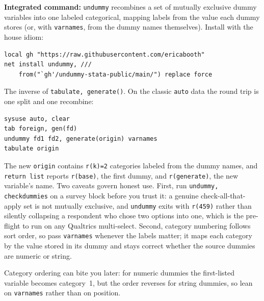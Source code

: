 \documentclass[
    a4paper,
    fontsize=10pt,
    twoside=true,
    numbers=noenddot,
]{kaobook}
\begin{document}
\begin{kaobox}[frametitle=Package Integration: \texttt{undummy}]
\textbf{Integrated command:} \texttt{undummy} recombines a set of mutually exclusive dummy variables into one labeled categorical, mapping labels from the value each dummy stores (or, with \texttt{varnames}, from the dummy names themselves). Install with the house idiom:
\par
{\footnotesize
\begin{verbatim}
local gh "https://raw.githubusercontent.com/ericabooth"
net install undummy, ///
    from("`gh'/undummy-stata-public/main/") replace force
\end{verbatim}
}
The inverse of \texttt{tabulate, generate()}. On the classic \texttt{auto} data the round trip is one split and one recombine:
\par
{\footnotesize
\begin{verbatim}
sysuse auto, clear
tab foreign, gen(fd)
undummy fd1 fd2, generate(origin) varnames
tabulate origin
\end{verbatim}
}
The new \texttt{origin} contains \texttt{r(k)=2} categories labeled from the dummy names, and \texttt{return list} reports \texttt{r(base)}, the first dummy, and \texttt{r(generate)}, the new variable's name. Two caveats govern honest use. First, run \texttt{undummy, checkdummies} on a survey block before you trust it: a genuine check-all-that-apply set is not mutually exclusive, and \texttt{undummy} exits with \texttt{r(459)} rather than silently collapsing a respondent who chose two options into one, which is the pre-flight to run on any Qualtrics multi-select. Second, category numbering follows sort order, so pass \texttt{varnames} whenever the labels matter; it maps each category by the value stored in its dummy and stays correct whether the source dummies are numeric or string.
\end{kaobox}

Category ordering can bite you later: for numeric dummies the first-listed variable becomes category~1, but the order reverses for string dummies, so lean on \texttt{varnames} rather than on position.
\end{document}
